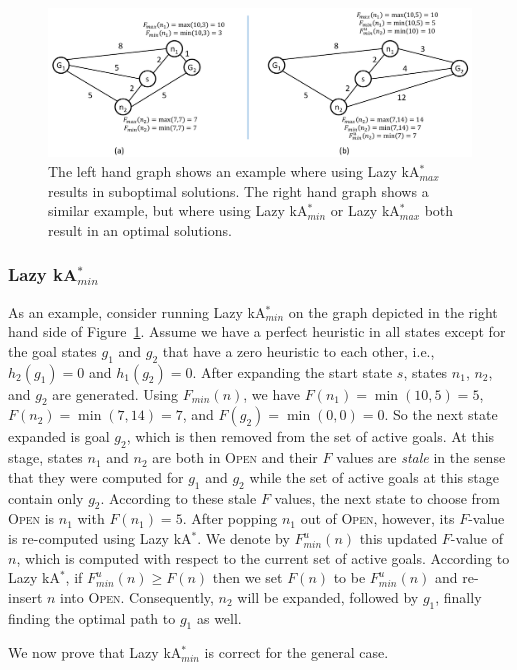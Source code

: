 \documentclass{aicom2e}
\newcommand{\kastar}{kA$^*$}
\newcommand{\kastarmin}{kA$^*_{min}$}
\newcommand{\kastarmax}{kA$^*_{max}$}
\newcommand{\minf}{$F_{min}(n)$}
\newcommand{\open}{\textsc{Open}}
\begin{document}
\begin{figure}
    \includegraphics[width=\textwidth]{Lazy_cropped.pdf}
    \caption{The left hand graph shows an example where using Lazy \kastarmax{}
results in suboptimal solutions. The right hand graph shows a similar example,
but where using Lazy \kastarmin{} or Lazy \kastarmax{} both result in an
optimal solutions.}
    \label{fig:lazy}
\end{figure}

\subsubsection{Lazy \kastarmin{}}

As an example, consider running Lazy \kastarmin{} on the graph depicted in the
right hand side of Figure~\ref{fig:lazy}. Assume we have a perfect heuristic in
all states except for the goal states $g_1$ and $g_2$ that have a zero
heuristic to each other, i.e., $h_2(g_1)=0$ and $h_1(g_2)=0$. After expanding
the start state $s$, states $n_1$, $n_2$, and $g_2$ are generated. Using
\minf{}, we have $F(n_1)=\min(10,5)=5$, $F(n_2)=\min(7,14)=7$, and
$F(g_2)=\min(0,0)=0$. So the next state expanded is goal $g_2$, which is then
removed from the set of active goals. At this stage, states $n_1$ and $n_2$ are
both in \open{} and their $F$ values are {\em stale} in the sense that they
were computed for $g_1$ and $g_2$ while the set of active goals at this stage
contain only $g_2$. According to these stale $F$ values, the next state to
choose from \open{} is $n_1$ with $F(n_1)=5$. After popping $n_1$ out of
\open{}, however, its $F$-value is re-computed using Lazy \kastar{}. We denote
by $F^u_{min}(n)$ this updated $F$-value of $n$, which is computed with respect
to the current set of active goals. According to Lazy \kastar{}, if
$F^u_{min}(n)\geq F(n)$ then we set $F(n)$ to be $F^u_{min}(n)$ and re-insert
$n$ into \open{}. Consequently, $n_2$ will be expanded, followed by $g_1$,
finally finding the optimal path to $g_1$ as well.

We now prove that Lazy \kastarmin{} is correct for the general case.
\end{document}
